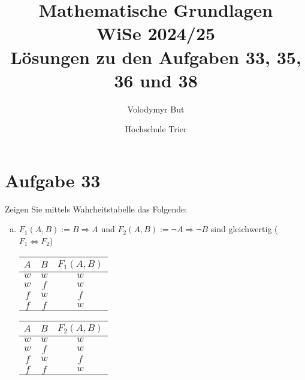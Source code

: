\documentclass[10pt, oneside]{article}
\title{Mathematische Grundlagen\\[10pt]\Large{WiSe 2024/25}\\[15pt]\Large{L{\"o}sungen zu den Aufgaben 33, 35, 36 und 38}}
\author{Volodymyr But}
\date{Hochschule Trier}
\begin{document}
\sloppy

\maketitle
\vspace{25px}

\section{Aufgabe 33}

Zeigen Sie mittels Wahrheitstabelle das Folgende:
\begin{enumerate}[a)]
    \item $F_1(A, B) := B \Rightarrow A$ und $F_2(A, B) := \lnot A \Rightarrow
        \lnot B$ sind gleichwertig ($F_1 \Leftrightarrow F_2$)
    \begin{table*}[h]
        \centering
        \begin{minipage}{.29\linewidth}
            \centering
            \begin{tabular}{|c|c|c|}
                \hline
                $A$ & $B$ & $F_1(A, B)$ \\
                \hline
                $w$ & $w$ & $w$ \\
                \hline
                $w$ & $f$ & $w$ \\
                \hline
                $f$ & $w$ & $f$ \\
                \hline
                $f$ & $f$ & $w$ \\
                \hline
            \end{tabular}
        \end{minipage}%
        \begin{minipage}{.29\linewidth}
            \centering
            \begin{tabular}{|c|c|c|}
                \hline
                $A$ & $B$ & $F_2(A, B)$ \\
                \hline
                $w$ & $w$ & $w$ \\
                \hline
                $w$ & $f$ & $w$ \\
                \hline
                $f$ & $w$ & $f$ \\
                \hline
                $f$ & $f$ & $w$ \\
                \hline
            \end{tabular}
        \end{minipage}  \\[15pt]

\end{table*}
\end{enumerate}
\end{document}

